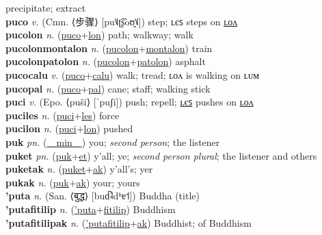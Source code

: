 precipitate; extract \label{puhtekilum} \\
\textbf{puco} \textit{v.} (Cmn. ⟨步骤⟩ [pu˥˩ʈ͡ʂoʊ̯˥˩])
step; ʟєꜱ steps on \hyperref[pucolon]{ʟᴏᴧ} \label{puco} \\
\textbf{pucolon} \textit{n.} (\hyperref[puco]{puco}+\hyperref[lon]{lon})
path; walkway; walk \label{pucolon} \\
\textbf{pucolonmontalon} \textit{n.} (\hyperref[pucolon]{pucolon}+\hyperref[montalon]{montalon})
train \label{pucolonmontalon} \\
\textbf{pucolonpatolon} \textit{n.} (\hyperref[pucolon]{pucolon}+\hyperref[patolon]{patolon})
asphalt \label{pucolonpatolon} \\
\textbf{pucocalu} \textit{v.} (\hyperref[puco]{puco}+\hyperref[calu]{calu})
walk; tread; ʟᴏᴧ is walking on ʟᴜᴍ \label{pucocalu} \\
\textbf{pucopal} \textit{n.} (\hyperref[puco]{puco}+\hyperref[pal]{pal})
cane; staff; walking stick \label{pucopal} \\
\textbf{puci} \textit{v.} (Epo. ⟨puŝi⟩ [ˈpuʃi])
push; repell; \hyperref[puciles]{ʟєꜱ} pushes on \hyperref[pucilon]{ʟᴏᴧ} \label{puci} \\
\textbf{puciles} \textit{n.} (\hyperref[puci]{puci}+\hyperref[les]{les})
force \label{puciles} \\
\textbf{pucilon} \textit{n.} (\hyperref[puci]{puci}+\hyperref[lon]{lon})
pushed \label{pucilon} \\
\textbf{puk} \textit{pn.} (\hyperref[min]{~~min~~})
you; \textit{second person}; the listener \label{puk} \\
\textbf{puket} \textit{pn.} (\hyperref[puk]{puk}+\hyperref[et]{et})
y’all; ye; \textit{second person plural}; the listener and others \label{puket} \\
\textbf{puketak} \textit{n.} (\hyperref[puket]{puket}+\hyperref[ak]{ak})
y’all’s; yer \label{puketak} \\
\textbf{pukak} \textit{n.} (\hyperref[puk]{puk}+\hyperref[ak]{ak})
your; yours \label{pukak} \\
\textbf{'puta} \textit{n.} (San. ⟨बुद्ध⟩ [bud̚˨dʱɐ˦])
Buddha (title) \label{'puta} \\
\textbf{'putafitilip} \textit{n.} (\hyperref['puta]{'puta}+\hyperref[fitilip]{fitilip})
Buddhism \label{'putafitilip} \\
\textbf{'putafitilipak} \textit{n.} (\hyperref['putafitilip]{'putafitilip}+\hyperref[ak]{ak})
Buddhist; of Buddhism \label{'putafitilipak} \\
